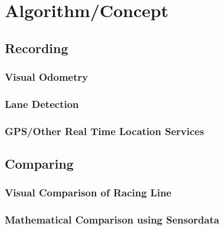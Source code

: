 \section{Algorithm/Concept}
\label{sec:algorithm}

\subsection{Recording}
\subsubsection{Visual Odometry}
\begin{easylist}
\end{easylist}
\subsubsection{Lane Detection}
\subsubsection{GPS/Other Real Time Location Services}
\subsection{Comparing}
\subsubsection{Visual Comparison of Racing Line}
\subsubsection{Mathematical Comparison using Sensordata}

\clearpage
